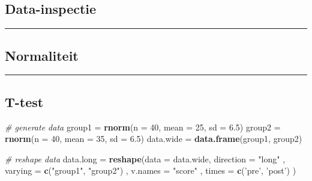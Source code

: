\documentclass[]{article}
\newenvironment{Shaded}{\begin{snugshade}}{\end{snugshade}}
\newcommand{\KeywordTok}[1]{\textcolor[rgb]{0.13,0.29,0.53}{\textbf{{#1}}}}
\newcommand{\DataTypeTok}[1]{\textcolor[rgb]{0.13,0.29,0.53}{{#1}}}
\newcommand{\DecValTok}[1]{\textcolor[rgb]{0.00,0.00,0.81}{{#1}}}
\newcommand{\FloatTok}[1]{\textcolor[rgb]{0.00,0.00,0.81}{{#1}}}
\newcommand{\StringTok}[1]{\textcolor[rgb]{0.31,0.60,0.02}{{#1}}}
\newcommand{\CommentTok}[1]{\textcolor[rgb]{0.56,0.35,0.01}{\textit{{#1}}}}
\newcommand{\NormalTok}[1]{{#1}}
\begin{document}
\subsection{Data-inspectie}\label{data-inspectie}

\begin{center}\rule{0.5\linewidth}{\linethickness}\end{center}

\newpage

\subsection{Normaliteit}\label{normaliteit}

\begin{center}\rule{0.5\linewidth}{\linethickness}\end{center}

\newpage

\subsection{T-test}\label{t-test}

\begin{Shaded}
\begin{Highlighting}[]
\CommentTok{# generate data}
\NormalTok{group1 =}\StringTok{ }\KeywordTok{rnorm}\NormalTok{(}\DataTypeTok{n =} \DecValTok{40}\NormalTok{, }\DataTypeTok{mean =} \DecValTok{25}\NormalTok{, }\DataTypeTok{sd =} \FloatTok{6.5}\NormalTok{)}
\NormalTok{group2 =}\StringTok{ }\KeywordTok{rnorm}\NormalTok{(}\DataTypeTok{n =} \DecValTok{40}\NormalTok{, }\DataTypeTok{mean =} \DecValTok{35}\NormalTok{, }\DataTypeTok{sd =} \FloatTok{6.5}\NormalTok{)}
\NormalTok{data.wide =}\StringTok{ }\KeywordTok{data.frame}\NormalTok{(group1, group2)}
\end{Highlighting}
\end{Shaded}

\begin{Shaded}
\begin{Highlighting}[]
\CommentTok{# reshape data}
\NormalTok{data.long =}\StringTok{ }\KeywordTok{reshape}\NormalTok{(}\DataTypeTok{data =} \NormalTok{data.wide, }
                    \DataTypeTok{direction =} \StringTok{"long"}
                    \NormalTok{, }\DataTypeTok{varying =} \KeywordTok{c}\NormalTok{(}\StringTok{"group1"}\NormalTok{, }\StringTok{"group2"}\NormalTok{)}
                    \NormalTok{, }\DataTypeTok{v.names =} \StringTok{"score"}
                    \NormalTok{, }\DataTypeTok{times   =} \KeywordTok{c}\NormalTok{(}\StringTok{'pre'}\NormalTok{, }\StringTok{'post'}\NormalTok{) }
                      \NormalTok{)}
\end{Highlighting}
\end{Shaded}
\end{document}

